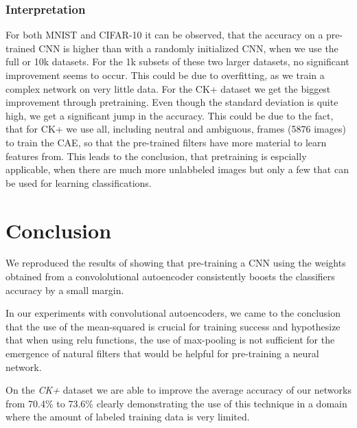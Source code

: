 \documentclass{article}
\begin{document}
    \subsubsection{Interpretation}
      For both MNIST and CIFAR-10 it can be observed, that the accuracy on a pre-trained CNN is higher than with a randomly initialized CNN, when we use the full or 10k datasets.
      For the 1k subsets of these two larger datasets, no significant improvement seems to occur. This could be due to overfitting, as we train a complex network on very little data.
      For the CK+ dataset we get the biggest improvement through pretraining.
      Even though the standard deviation is quite high, we get a significant jump in the accuracy.
      This could be due to the fact, that for CK+ we use all, including neutral and ambiguous, frames (5876 images) to train the CAE, so that the pre-trained filters have more material to learn features from.
      This leads to the conclusion, that pretraining is espcially applicable, when there are much more unlabbeled images but only a few that can be used for learning classifications.


\section{Conclusion}

  We reproduced the results of \citep{masci11} showing that pre-training a CNN using the weights obtained from a convololutional autoencoder consistently boosts the classifiers accuracy by a small margin. 

  In our experiments with convolutional autoencoders, we came to the conclusion that the use of the mean-squared is crucial for training success and hypothesize that when using relu functions, the use of max-pooling is not sufficient for the emergence of natural filters that would be helpful for pre-training a neural network. 

  On the \emph{CK+} dataset we are able to improve the average accuracy of our networks from 70.4\% to 73.6\% clearly demonstrating the use of this technique in a domain where the amount of labeled training data is very limited. 

\end{document}
